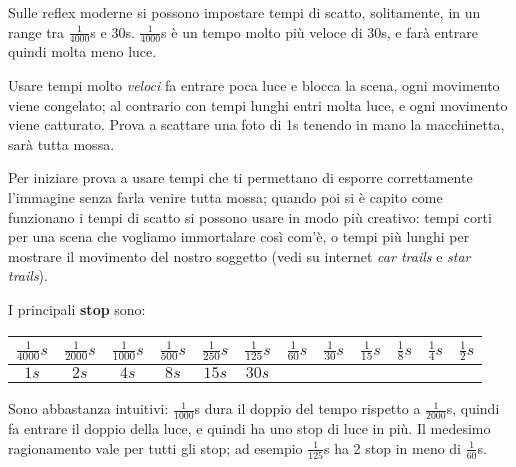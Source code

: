 Sulle reflex moderne si possono impostare tempi di scatto, solitamente, in un range tra $\frac{1}{4000}$s e 30s.\newline
$\frac{1}{4000}$s è un tempo molto più veloce di 30s, e farà entrare quindi molta meno luce.

Usare tempi molto \textit{veloci} fa entrare poca luce e blocca la scena, ogni movimento viene congelato; al contrario con tempi lunghi entri molta luce, e ogni movimento viene catturato. Prova a scattare una foto di 1s tenendo in mano la macchinetta, sarà tutta mossa.

Per iniziare prova a usare tempi che ti permettano di esporre correttamente l'immagine senza farla venire tutta mossa; quando poi si è capito come funzionano i tempi di scatto si possono usare in modo più creativo: tempi corti per una scena che vogliamo immortalare così com'è, o tempi più lunghi per mostrare il movimento del nostro soggetto (vedi su internet \textit{car trails} e \textit{star trails}).

I principali \textbf{stop} sono:
\begin{table}[h]
    \centering
    \begin{tabular}{|c|c|c|c|c|c|c|c|c|c|c|c|} 
        \hline
        $\frac{1}{4000}s$ & $\frac{1}{2000}s$ & $\frac{1}{1000}s$ & $\frac{1}{500}s$ & $\frac{1}{250}s$                                & $\frac{1}{125}s$ & $\frac{1}{60}s$       & $\frac{1}{30}s$       & $\frac{1}{15}s$       & $\frac{1}{8}s$        & $\frac{1}{4}s$        & $\frac{1}{2}s$         \\[0.3cm] 
        \hline
        $1s$              & $2s$              & $4s$              & $8s$             & $15s$ & $30s$            & \multicolumn{1}{l|}{} & \multicolumn{1}{l|}{} & \multicolumn{1}{l|}{} & \multicolumn{1}{l|}{} & \multicolumn{1}{l|}{} & \multicolumn{1}{l|}{}  \\
        \hline
    \end{tabular}
\end{table}

Sono abbastanza intuitivi: $\frac{1}{1000}$s dura il doppio del tempo rispetto a $\frac{1}{2000}$s, quindi fa entrare il doppio della luce, e quindi ha uno stop di luce in più.\newline
Il medesimo ragionamento vale per tutti gli stop; ad esempio $\frac{1}{125}$s ha 2 stop in meno di $\frac{1}{60}$s.

